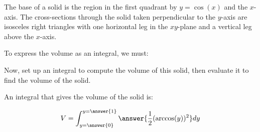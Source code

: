 \documentclass{ximera}
\author{Jim Talamo and Alex Beckwith}
\begin{document}
\begin{exercise}


The base of a solid is the region in the first quadrant by $y=\cos(x)$ and the $x$-axis. The cross-sections through the solid taken perpendicular to the $y$-axis are isosceles right triangles with one horizontal leg in the $xy$-plane and a vertical leg above the $x$-axis. 

            \begin{image}
            \end{image}

	


\begin{exercise}
To express the volume as an integral, we must:
\begin{multipleChoice}
\end{multipleChoice}

\begin{exercise}
Now, set up an integral to compute the volume of this solid, then evaluate it to find the volume of the solid.

An integral that gives the volume of the solid is:

\[
	V= \int_{y=\answer{0}}^{y=\answer{1}}
	\answer{\frac{1}{2} (\arccos(y))^2 } dy
	\]

	\end{exercise}
	\end{exercise}
	\end{exercise}
\end{document}
